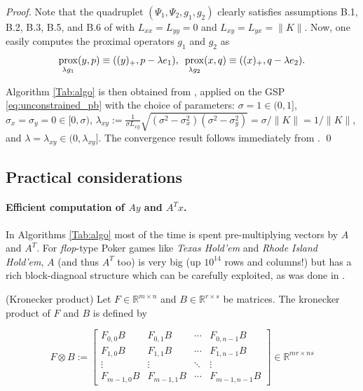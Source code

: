 \documentclass[envcountsame]{llcns2e/llncs}
\DeclareMathOperator{\prox}{prox}
\begin{document}
\begin{proof}
Note that the quadruplet $(\Psi_1, \Psi_2, g_1, g_2)$ clearly satisfies
assumptions B.1, B.2, B.3, B.5, and B.6 of \cite{he2013accelerating}
with $L_{xx} = L_{yy} = 0$ and $L_{xy} = L_{yx} = \|K\|$. Now,
one easily computes the proximal operators $g_1$ and $g_2$ as
\begin{eqnarray*}
  \prox_{\lambda g_1}(y, p) \equiv ((y)_+, p - \lambda
  e_1),\hspace{.5em} \prox_{\lambda g_2}(x, q) \equiv ((x)_+, q -
  \lambda e_2).
  \end{eqnarray*}

Algorithm \ref{Tab:algo} is then obtained from \cite[Algorithm
  T-BD]{he2013accelerating}, applied on the GSP
\eqref{eq:unconstrained_pb} with the choice of parameters: $\sigma = 1
\in (0, 1]$, $\sigma_x = \sigma_y = 0 \in [0, \sigma)$,
    $\lambda_{xy} := \frac{1}{\sigma L_{xy}}\sqrt{(\sigma^2 -
        \sigma_x^2)(\sigma^2 - \sigma_y^2)} = \sigma / \|K\| =
      1/\|K\|$, and $\lambda = \lambda_{xy} \in (0,
      \lambda_{xy}]$. The convergence result follows immediately from
  \cite[Theorem 4.2]{he2013accelerating}.
  \qed
\end{proof}

\subsection{Practical considerations}
\paragraph{\textbf{Efficient computation of $Ay$ and $A^Tx$.}}
In Algorithms \ref{Tab:algo} most of the time is spent
pre-multiplying vectors by $A$ and $A^T$. For \textit{flop}-type Poker
games like \textit{Texas Hold'em} and  \textit{Rhode Island Hold'em},
$A$ (and thus $A^T$ too)  is very big (up $10^{14}$ rows and columns!)
but has a rich block-diagnoal structure which can be carefully
exploited, as was done in \cite{hoda2010smoothing}.


\begin{definition}(Kronecker product)
Let $F \in \mathbb{R}^{m \times n}$ and $B \in \mathbb{R}^{r \times
  s}$ be matrices. The kronecker product of $F$ and $B$ is defined by

\begin{equation}
F \otimes B:=\left[
\begin{array}{cccc}
F_{0,0}B & F_{0,1}B & \cdots & F_{0,n-1}B \\
F_{1,0}B & F_{1,1}B & \cdots & F_{1,n-1}B \\
\vdots & \vdots & \ddots & \vdots\\
F_{m-1,0}B & F_{m-1,1}B & \cdots & F_{m-1,n-1}B 
\end{array}\right] \in \mathbb{R}^{mr \times ns}
\end{equation}
\end{definition}
\end{document}
